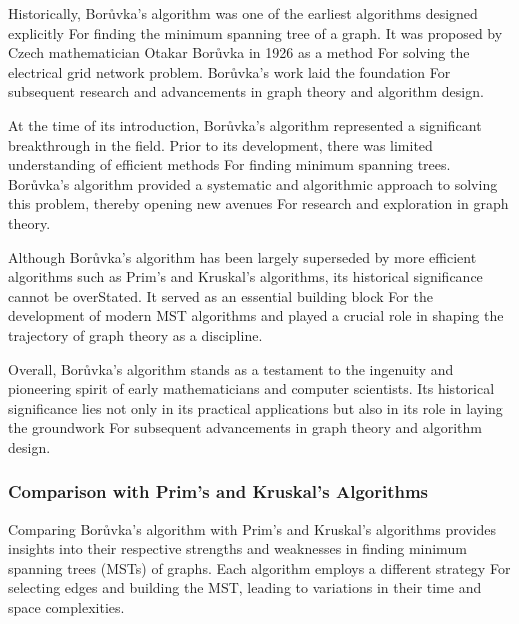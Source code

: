\documentclass[12pt]{book} %
\begin{document}
Historically, Borůvka's algorithm was one of the earliest algorithms designed explicitly For finding the minimum spanning tree of a graph. It was proposed by Czech mathematician Otakar Borůvka in 1926 as a method For solving the electrical grid network problem. Borůvka's work laid the foundation For subsequent research and advancements in graph theory and algorithm design.

At the time of its introduction, Borůvka's algorithm represented a significant breakthrough in the field. Prior to its development, there was limited understanding of efficient methods For finding minimum spanning trees. Borůvka's algorithm provided a systematic and algorithmic approach to solving this problem, thereby opening new avenues For research and exploration in graph theory.

Although Borůvka's algorithm has been largely superseded by more efficient algorithms such as Prim's and Kruskal's algorithms, its historical significance cannot be overStated. It served as an essential building block For the development of modern MST algorithms and played a crucial role in shaping the trajectory of graph theory as a discipline.

Overall, Borůvka's algorithm stands as a testament to the ingenuity and pioneering spirit of early mathematicians and computer scientists. Its historical significance lies not only in its practical applications but also in its role in laying the groundwork For subsequent advancements in graph theory and algorithm design.

\subsubsection{Comparison with Prim's and Kruskal's Algorithms}
Comparing Borůvka's algorithm with Prim's and Kruskal's algorithms provides insights into their respective strengths and weaknesses in finding minimum spanning trees (MSTs) of graphs. Each algorithm employs a different strategy For selecting edges and building the MST, leading to variations in their time and space complexities.
\end{document}
